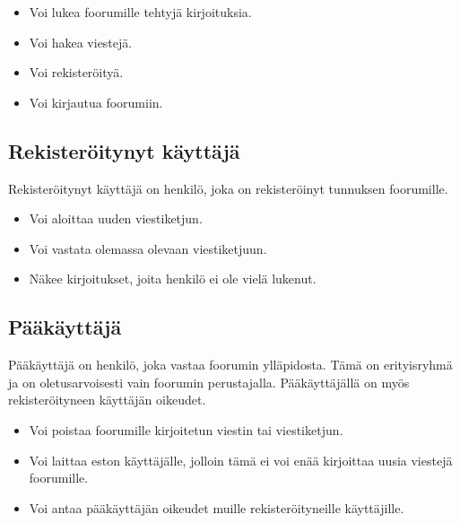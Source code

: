 \documentclass[a4paper, 12pt, finnish]{article}
\begin{document}
\begin{itemize}
\item
Voi lukea foorumille tehtyjä kirjoituksia.

\item
Voi hakea viestejä.

\item
Voi rekisteröityä.

\item
Voi kirjautua foorumiin.
\end{itemize}

\subsection{Rekisteröitynyt käyttäjä}
Rekisteröitynyt käyttäjä on henkilö, joka on rekisteröinyt tunnuksen foorumille.

\begin{itemize}
\item
    Voi aloittaa uuden viestiketjun.
\item
    Voi vastata olemassa olevaan viestiketjuun.
\item
    Näkee kirjoitukset, joita henkilö ei ole vielä lukenut.
\end{itemize}

\subsection{Pääkäyttäjä}
Pääkäyttäjä on henkilö, joka vastaa foorumin ylläpidosta.
Tämä on erityisryhmä ja on oletusarvoisesti vain foorumin perustajalla. Pääkäyttäjällä on myös rekisteröityneen käyttäjän oikeudet.

\begin{itemize}
\item
Voi poistaa foorumille kirjoitetun viestin tai viestiketjun.
\item
Voi laittaa eston käyttäjälle, jolloin tämä ei voi enää kirjoittaa uusia viestejä foorumille.
\item
Voi antaa pääkäyttäjän oikeudet muille rekisteröityneille käyttäjille.
\end{itemize}

\newpage
\end{document}
